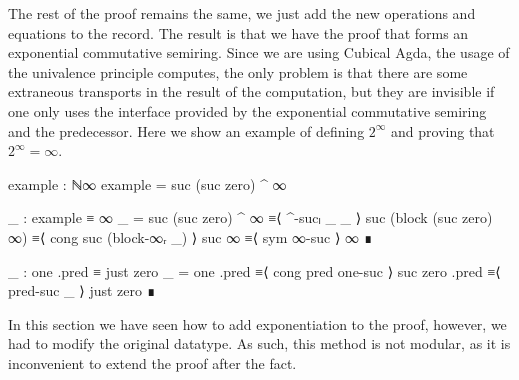 The rest of the proof remains the same, we just add the new operations and
equations to the  record. The result is that we have the proof
that  forms an exponential commutative semiring. Since we are
using Cubical Agda, the usage of the univalence principle computes, the only
problem is that there are some extraneous transports in the result of the
computation, but they are invisible if one only uses the interface provided by
the exponential commutative semiring and the predecessor. Here we show an
example of defining $2^\infty$ and proving that $2^\infty = \infty$.
\begin{code}
  example : ℕ∞
  example = suc (suc zero) ^ ∞

  _ : example ≡ ∞
  _ =
    suc (suc zero) ^ ∞        ≡⟨ ^-sucₗ _ _ ⟩
    suc (block (suc zero) ∞)  ≡⟨ cong suc (block-∞ᵣ _) ⟩
    suc ∞                     ≡⟨ sym ∞-suc ⟩
    ∞                         ∎
\end{code}
\begin{code}[hide]
  _ : one .pred ≡ just zero
  _ =
    one .pred      ≡⟨ cong pred one-suc ⟩
    suc zero .pred ≡⟨ pred-suc _ ⟩
    just zero      ∎
\end{code}

In this section we have seen how to add exponentiation to the proof, however, we
had to modify the original  datatype. As such, this method is
not modular, as it is inconvenient to extend the proof after the fact.
